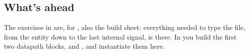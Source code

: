 \subsection{What's ahead}
The exercises in  are, for , also the build sheet:
everything needed to type the file, from the entity down to the last internal signal, is there. In
 you build the first two datapath blocks,  and , and
instantiate them here.
